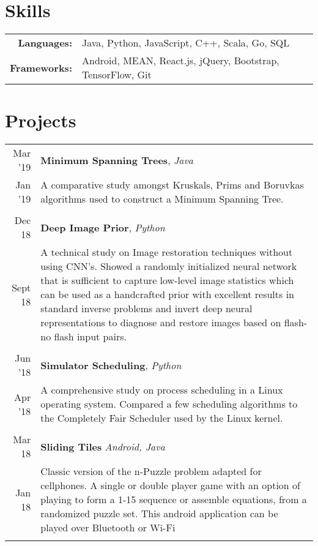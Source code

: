 \documentclass[a4paper,10pt]{article}
\begin{document}
\section{Skills}
\begin{tabular}{ rl }
	\textbf{Languages:}  & Java, Python, JavaScript, C++, Scala, Go, SQL \\
	\textbf{Frameworks:} & Android, MEAN, React.js, jQuery, Bootstrap, TensorFlow, Git \\%
\end{tabular}

\section{Projects}
\begin{tabular}{r|p{16cm}}

Mar '19 & \textbf{Minimum Spanning Trees}, \sl{Java} \\
Jan '19 & \footnotesize{A comparative study amongst Kruskal\textquotesingle{}s, Prim\textquotesingle{}s and Boruvka\textquotesingle{}s algorithms used to construct a Minimum Spanning Tree.}\\\multicolumn{2}{c}{} \\

Dec \textquotesingle{}18 & \textbf{Deep Image Prior}, \sl{Python} \\ 
Sept \textquotesingle{}18 & \footnotesize{A technical study on Image restoration techniques without using CNN’s. Showed a randomly initialized neural network that is sufficient to capture low-level image statistics which can be used as a handcrafted prior with excellent results in standard inverse problems and invert deep neural representations to diagnose and restore images based on flash-no flash input pairs.}\\\multicolumn{2}{c}{}\\

Jun '18 & \textbf{Simulator Scheduling}, \sl{Python} \\
Apr '18 & \footnotesize{A comprehensive study on process scheduling in a Linux operating system.  Compared a few scheduling algorithms to the Completely Fair Scheduler used by the Linux kernel.}\\\multicolumn{2}{c}{} \\

Mar \textquotesingle{}18 & {\textbf{Sliding Tiles}} {\sl Android, Java}  \\
Jan \textquotesingle{}18 & \footnotesize{Classic version of the n-Puzzle problem adapted for cellphones. A single or double player game with an option of playing to form a 1-15 sequence or assemble equations, from a randomized puzzle set. This android application can be played over Bluetooth or Wi-Fi}\\ \multicolumn{2}{c}{} \\


\end{tabular}
\end{document}
